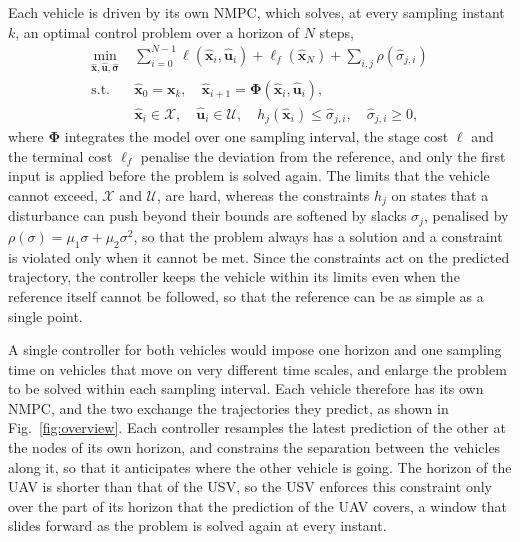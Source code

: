 Each vehicle is driven by its own NMPC, which solves, at every sampling instant $k$, an optimal control problem over a horizon of $N$ steps,
\begin{equation}
\begin{aligned}
    \min_{\hat{\mathbf{x}},\hat{\mathbf{u}},\hat{\boldsymbol\sigma}} \;& \sum_{i=0}^{N-1}\ell(\hat{\mathbf{x}}_{i},\hat{\mathbf{u}}_{i}) + \ell_f(\hat{\mathbf{x}}_{N}) + \sum_{i,j} \rho(\hat\sigma_{j,i}) \\
    \text{s.t.}\;& \hat{\mathbf{x}}_{0} = \mathbf{x}_k, \quad \hat{\mathbf{x}}_{i+1} = \boldsymbol\Phi(\hat{\mathbf{x}}_{i},\hat{\mathbf{u}}_{i}), \\
    & \hat{\mathbf{x}}_{i}\in\mathcal{X}, \quad \hat{\mathbf{u}}_{i}\in\mathcal{U}, \quad h_j(\hat{\mathbf{x}}_{i}) \le \hat\sigma_{j,i}, \quad \hat\sigma_{j,i}\ge 0,
\end{aligned}
\label{eq:ocp}
\end{equation}
where $\boldsymbol\Phi$ integrates the model over one sampling interval, the stage cost $\ell$ and the terminal cost $\ell_f$ penalise the deviation from the reference, and only the first input is applied before the problem is solved again. The limits that the vehicle cannot exceed, $\mathcal{X}$ and $\mathcal{U}$, are hard, whereas the constraints $h_j$ on states that a disturbance can push beyond their bounds are softened by slacks $\sigma_j$, penalised by $\rho(\sigma) = \mu_1\sigma + \mu_2\sigma^2$, so that the problem always has a solution and a constraint is violated only when it cannot be met. Since the constraints act on the predicted trajectory, the controller keeps the vehicle within its limits even when the reference itself cannot be followed, so that the reference can be as simple as a single point.

A single controller for both vehicles would impose one horizon and one sampling time on vehicles that move on very different time scales, and enlarge the problem to be solved within each sampling interval. Each vehicle therefore has its own NMPC, and the two exchange the trajectories they predict, as shown in Fig.~\ref{fig:overview}. Each controller resamples the latest prediction of the other at the nodes of its own horizon, and constrains the separation between the vehicles along it, so that it anticipates where the other vehicle is going. The horizon of the UAV is shorter than that of the USV, so the USV enforces this constraint only over the part of its horizon that the prediction of the UAV covers, a window that slides forward as the problem is solved again at every instant.


